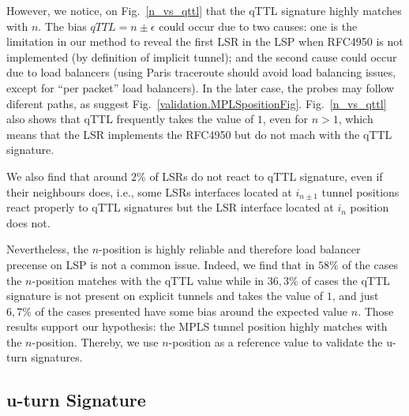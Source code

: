 However, we notice, on Fig.~\ref{n_vs_qttl} that the qTTL signature highly
matches with $n$.   The bias $\textit{qTTL}=n \pm \epsilon$ could occur due to
two causes: one is the limitation in our method to reveal the first LSR in the
LSP when RFC4950 is not implemented (by definition of implicit tunnel); and the
second cause could occur due to load balancers (using Paris traceroute should
avoid load balancing issues, except for ``per packet'' load balancers).
In the later case, the \traceroute probes may follow diferent paths, as suggest Fig.~\ref{validation.MPLSpositionFig}. Fig.~\ref{n_vs_qttl} also
shows that qTTL frequently takes the value of $1$, even for $n>1$, which means
that the LSR implements the RFC4950 but do not mach with the qTTL signature.


We also find that around $2\%$ of LSRs do not react to qTTL signature, even
if their neighbours does, i.e., some LSRs interfaces located at
$i_{n \pm 1}$ tunnel positions react properly to qTTL signatures but the LSR
interface located at $i_n$ position does not.


Nevertheless, the $n$-position is highly reliable and therefore load balancer precense on
LSP is not a common issue. Indeed, we find that in
$58\%$ of the cases the $n$-position matches with the qTTL value while in
$36,3\%$ of cases the qTTL signature is not present on explicit tunnels and takes the value of $1$,
and just $6,7\%$ of the cases presented have some bias around the expected value
$n$. Those results support our hypothesis: the  MPLS tunnel position highly
matches with the $n$-position. Thereby,  we use $n$-position as a reference
value to validate the u-turn signatures.

\subsection{u-turn Signature}\label{validation.uturn}


